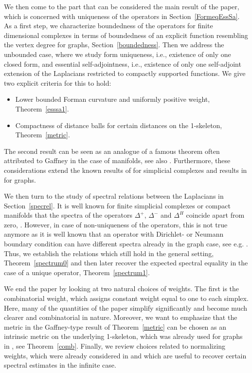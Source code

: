 \documentclass[10pt]{amsart}
\theoremstyle{definition}
\newcommand{\Hmm}[1]{\leavevmode{\marginpar{\tiny%
			$\hbox to 0mm{\hspace*{-0.5mm}$\leftarrow$\hss}%
			\vcenter{\vrule depth 0.1mm height 0.1mm width \the\marginparwidth}%
			\hbox to 0mm{\hss$\rightarrow$\hspace*{-0.5mm}}$\\\relax\raggedright #1}}}
\begin{document}
We then come to the part that can be considered the main result of the paper, which is concerned with uniqueness of the operators in Section~\ref{FormeqEssSa}. As a first step, we characterize boundedness of the operators for finite dimensional complexes in terms of boundedness of an explicit function resembling the vertex degree for graphs, Section~\ref{boundedness}.
Then we address the unbounded case, where we study form uniqueness, i.e., existence of only one closed form, and essential self-adjointness, i.e., existence of only one self-adjoint extension of the Laplacians restricted to compactly supported functions. 
We give two explicit criteria for this to hold:
\begin{itemize}
	\item [(1)] Lower bounded Forman curvature and uniformly positive weight, Theorem~\ref{esssa1}.
	\item [(2)] Compactness of distance balls for certain distances on the 1-skeleton, Theorem~\ref{metric}. 
\end{itemize}
The second result can be seen as an analogue of a famous theorem often attributed to Gaffney \cite{G} in the case of manifolds, see also  \cite{Chernoff,Roe,Strichartz}. Furthermore, these considerations extend the known results of \cite{AACT,baloudi2019adjacency,BH,C,Masamune} for simplicial complexes and results in \cite{CTT,GKS,Go,HKMW,KL,Milatovic,S} for graphs.%

We then turn to the study of spectral relations between the Laplacians in Section~\ref{specrel}. It is well known for finite simplicial complexes or compact manifolds that the spectra of the operators $\Delta^{+}$, $\Delta^{-}$ and $\Delta^{H}$ coincide apart from zero, \cite{HJ}. However, in case of non-uniqueness of the operators, this is not true anymore as it is well known that an operator with Dirichlet- or Neumann boundary condition can have different spectra already in the graph case, see e.g. \cite{duefel2024boundaryconditionsmatterspectrum}. 
Thus, we establish the relations which still hold in the general setting, Theorem~\ref{spectrum0} and then later recover the expected spectral equality in the case of a unique operator, Theorem~\ref{spectrum1}.

We end the paper by looking at two natural choices of weights. The first is the combinatorial weight, which assigns constant weight equal to one to each simplex. Here, many of the quantities of the paper simplify significantly and become much clearer and combinatorial in nature. Moreover, we want to emphasize that the metric in the Gaffney-type result of Theorem~\ref{metric} can be chosen as an intrinsic metric on the underlying 1-skeleton, which was already used for graphs in \cite{HKMW}, see Theorem~\ref{comb}. Finally, we review choices related to normalizing weights, which were already considered in \cite{HJ} and which are useful to recover certain spectral estimates in the infinite case.
\end{document}
